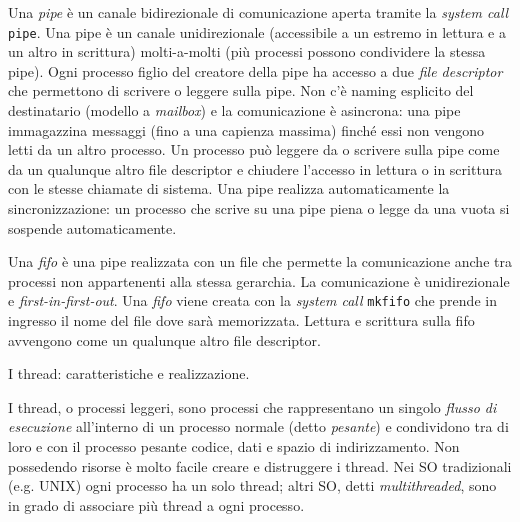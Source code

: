 \documentclass[answers,a4paper,12pt]{exam}
\begin{document}
\begin{questions}
\begin{solutionorlines}[3.8in]
Una \textit{pipe} è un canale bidirezionale di comunicazione aperta tramite la \textit{system call} \texttt{pipe}. Una pipe è un canale unidirezionale (accessibile a un estremo in lettura e a un altro in scrittura)  molti-a-molti (più processi possono condividere la stessa pipe). Ogni processo figlio del creatore della pipe ha accesso a due \textit{file descriptor} che permettono di scrivere o leggere sulla pipe. Non c'è naming esplicito del destinatario (modello a \textit{mailbox}) e la comunicazione è asincrona: una pipe immagazzina messaggi (fino a una capienza massima) finché essi non vengono letti da un altro processo. Un processo può leggere da o scrivere sulla pipe come da un qualunque altro file descriptor e chiudere l'accesso in lettura o in scrittura con le stesse chiamate di sistema. Una pipe realizza automaticamente la sincronizzazione: un processo che scrive su una pipe piena o legge da una vuota si sospende automaticamente. 

Una \textit{fifo} è una pipe realizzata con un file che permette la comunicazione anche tra processi non appartenenti alla stessa gerarchia. La comunicazione è unidirezionale e \textit{first-in-first-out}. Una \textit{fifo} viene creata con la \textit{system call} \texttt{mkfifo} che prende in ingresso il nome del file dove sarà memorizzata. Lettura e scrittura sulla fifo avvengono come un qualunque altro file descriptor. 

\end{solutionorlines}


\question 
I thread: caratteristiche e realizzazione.
\begin{solutionorlines}[3.8in]I thread, o processi leggeri, sono processi che rappresentano un singolo \textit{flusso di esecuzione} all'interno di un processo normale (detto \textit{pesante}) e condividono tra di loro e con il processo pesante codice, dati e spazio di indirizzamento. Non possedendo risorse è molto facile creare e distruggere i thread. Nei SO tradizionali (e.g. UNIX) ogni processo ha un solo thread; altri SO, detti \textit{multithreaded}, sono in grado di associare più thread a ogni processo. 
	

\end{solutionorlines}
\end{questions}
\end{document}
